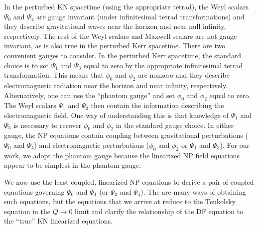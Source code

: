 \begin{refsection}
In the perturbed KN spacetime (using the appropriate tetrad), the Weyl scalars $\Psi_0$ and $\Psi_4$ are gauge invariant (under infinitesimal tetrad transformations) and they describe gravitational waves near the horizon and near null infinity, respectively.  The rest of the Weyl scalars and Maxwell scalars are not gauge invariant, as is also true in the perturbed Kerr spacetime. There are two convenient gauges to consider. In the perturbed Kerr spacetime, the standard choice is to set $\Psi_1$ and $\Psi_3$ equal to zero by the appropriate infinitesimal tetrad transformation. This means that $\phi_0$ and $\phi_2$  are nonzero and they  describe electromagnetic radiation near the horizon and near infinity, respectively. Alternatively, one can use the ``phantom gauge'' \cite{ChandraBook} and set $\phi_0$ and $\phi_2$ equal to zero. The Weyl scalars $\Psi_1$ and $\Psi_3$ then contain the information describing the electromagnetic field. One way of understanding this is that knowledge of $\Psi_1$ and $\Psi_3$ is necessary to recover  $\phi_0$ and $\phi_2$ in the standard gauge choice. In either gauge, the NP equations contain coupling between gravitational perturbations ($\Psi_0$ and $\Psi_4$) and electromagnetic perturbations ($\phi_0$ and $\phi_2$ or $\Psi_1$ and $\Psi_3$). For our work, we adopt the phantom gauge because the linearized NP field equations appear to be simplest in the phantom gauge. 

We now use the least coupled, linearized NP equations to derive a pair of coupled equations governing $\Psi_0$ and $\Psi_1$ (or $\Psi_3$ and $\Psi_4$). The are many ways of obtaining such equations, but the equations that we arrive at reduce to the Teukolsky equation in the $Q \to 0$ limit and clarify the relationship of the DF equation to the ``true'' KN linearized equations.


\end{refsection}
